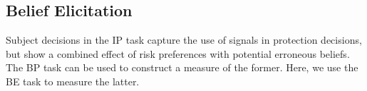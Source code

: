 \documentclass[12pt,a4paper]{article}
\begin{document}

\begin{table}[H]\centering 
\caption{Average Protection by Signal Type} 
\label{tab:nonparIP}
\end{table}



\subsection{Belief Elicitation}
Subject decisions in the IP task capture the use of signals in protection decisions, but show a combined effect of risk preferences with potential erroneous beliefs.  The BP task can be used to construct a measure of the former. Here, we use the BE task to measure the latter.  


\end{document}
